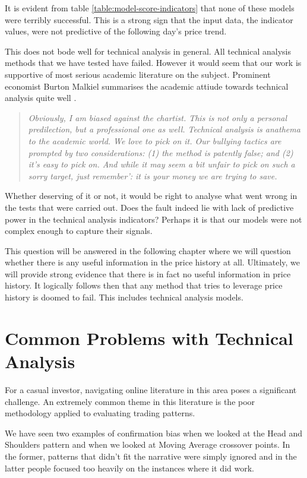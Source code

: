 \documentclass{report}
\begin{document}
It is evident from table \ref{table:model-score-indicators} that none of these models were terribly successful. This is a strong sign that the input data, the indicator values, were not predictive of the following day's price trend.

This does not bode well for technical analysis in general. All technical analysis methods that we have tested have failed. However it would seem that our work is supportive of most serious academic literature on the subject. Prominent economist Burton Malkiel summarises the academic attiude towards technical analysis quite well \cite{malkielrandomwalk}.

\begin{quotation}
\textit{Obviously, I am biased against the chartist. This is not only a personal predilection, but a professional one as well. Technical analysis is anathema to the academic world. We love
to pick on it. Our bullying tactics are prompted by two considerations: (1) the method is
patently false; and (2) it's easy to pick on. And while it may seem a bit unfair to pick on
such a sorry target, just remember': it is your money we are trying to save.}  
\end{quotation}

Whether deserving of it or not, it would be right to analyse what went wrong in the tests that were carried out. Does the fault indeed lie with lack of predictive power in the technical analysis indicators? Perhaps it is that our models were not complex enough to capture their signals.

This question will be answered in the following chapter where we will question whether there is any useful information in the price history at all. Ultimately, we will provide strong evidence that there is in fact no useful information in price history. It logically follows then that any method that tries to leverage price history is doomed to fail. This includes technical analysis models.

\section{Common Problems with Technical Analysis}

For a casual investor, navigating online literature in this area poses a significant challenge. An extremely common theme in this literature is the poor methodology applied to evaluating trading patterns.

We have seen two examples of confirmation bias when we looked at the Head and Shoulders pattern and when we looked at Moving Average crossover points. In the former, patterns that didn't fit the narrative were simply ignored and in the latter people focused too heavily on the instances where it did work.
\end{document}
